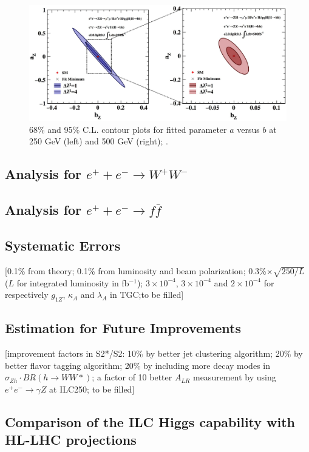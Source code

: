 \begin{figure}
\begin{center}
\includegraphics[width=0.85\hsize]{chapters/figures/ZH_anomHVV_ab.eps}
\end{center}
  \caption{68\% and 95\% C.L. contour plots for fitted parameter $a$ versus $b$ at 250 GeV (left)
  and 500 GeV (right);
  \cite{anomHVV}.}
  \label{fig:ZHanomHVV2}
\end{figure}


\subsection{Analysis for $e^++e^-\to W^+W^-$}

\subsection{Analysis for $e^++e^-\to f\bar{f}$}

\subsection{Systematic Errors}
[0.1\% from theory; 0.1\% from luminosity and beam polarization; 0.3\%$\times\sqrt{250/L}$ ($L$ 
for integrated luminosity in fb$^{-1}$); $3\times10^{-4}$,
$3\times10^{-4}$ and
$2\times10^{-4}$ for respectively $g_{1Z}$, $\kappa_A$ and
$\lambda_A$ in TGC;to be filled]

\subsection{Estimation for Future Improvements}
[improvement factors in S2*/S2: 10\% by better jet clustering algorithm; 
20\% by better flavor tagging algorithm; 20\% by 
including more decay modes in $\sigma_{Zh}\cdot BR(h\to WW*)$; a factor of 10 better $A_{LR}$
measurement by using $e^+e^-\to\gamma Z$ at ILC250; to be filled]

\subsection{Comparison of the ILC Higgs capability with 
HL-LHC projections}

